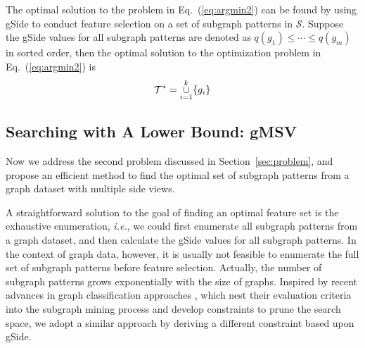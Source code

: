 \documentclass[conference]{IEEEtran}
\newcommand{\gscore}[0]{gSide}
\newcommand{\galgo}[0]{gMSV}
\begin{document}
The optimal solution to the problem in Eq.~(\ref{eq:argmin2}) can be found by using {\gscore} to conduct feature selection on a set of subgraph patterns in $\mathcal{S}$. Suppose the {\gscore} values for all subgraph patterns are denoted as $q(g_1)\le\cdots\le q(g_m)$ in sorted order, then the optimal solution to the optimization problem in Eq.~(\ref{eq:argmin2}) is
\begin{equation}
\mathcal{T}^*=\operatornamewithlimits{\cup}_{i=1}^k\{g_i\}
\label{eq:T}
\end{equation}\subsection{Searching with A Lower Bound: \galgo}%

Now we address the second problem discussed in Section~\ref{sec:problem}, and propose an efficient method to find the optimal set of subgraph patterns from a graph dataset with multiple side views.

A straightforward solution to the goal of finding an optimal feature set is the exhaustive enumeration, \emph{i.e.}, we could first enumerate all subgraph patterns from a graph dataset, and then calculate the {\gscore} values for all subgraph patterns. In the context of graph data, however, it is usually not feasible to enumerate the full set of subgraph patterns before feature selection. Actually, the number of subgraph patterns grows exponentially with the size of graphs. Inspired by recent advances in graph classification approaches \cite{cao2015identification,kong2010multi,kong2010semi,yan2008mining}, which nest their evaluation criteria into the subgraph mining process and develop constraints to prune the search space, we adopt a similar approach by deriving a different constraint based upon {\gscore}.
\end{document}
